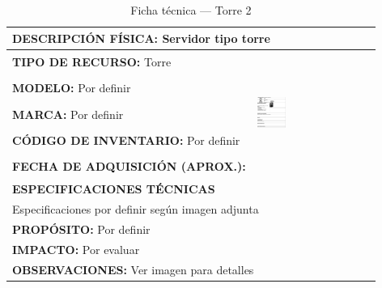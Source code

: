 \begin{table}[H]
\centering
\caption{Ficha técnica --- Torre 2}
\label{tab:torre-2}
\begin{tabular}{|p{}|p{}|}
\hline
\multicolumn{2}{|l|}{\textbf{DESCRIPCIÓN FÍSICA:} Servidor tipo torre} \\ \hline
\textbf{TIPO DE RECURSO:} Torre & 
\multirow{5}{*}{\includegraphics[width=0.25\textwidth,height=4cm,keepaspectratio]{tablas-images/cp1/torres/torre-2.png}} \\ \cline{1-1}
\textbf{MODELO:} Por definir & \\ \cline{1-1}
\textbf{MARCA:} Por definir & \\ \cline{1-1}
\textbf{CÓDIGO DE INVENTARIO:} Por definir & \\ \cline{1-1}
\textbf{FECHA DE ADQUISICIÓN (APROX.):} & \\ \hline
\multicolumn{2}{|l|}{\textbf{ESPECIFICACIONES TÉCNICAS}} \\ \hline
\multicolumn{2}{|p{0.95\textwidth}|}{
\footnotesize
Especificaciones por definir según imagen adjunta
} \\ \hline
\multicolumn{2}{|l|}{\textbf{PROPÓSITO:} Por definir} \\ \hline
\multicolumn{2}{|l|}{\textbf{IMPACTO:} Por evaluar} \\ \hline
\multicolumn{2}{|l|}{\textbf{OBSERVACIONES:} Ver imagen para detalles} \\ \hline
\end{tabular}
\end{table}

